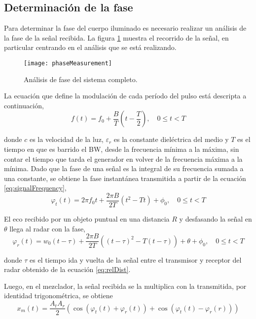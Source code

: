 \subsection{Determinación de la fase}

Para determinar la fase del cuerpo iluminado es necesario realizar un análisis de la fase de la señal recibida. La figura \ref{fig:phaseSystem} muestra el recorrido de la señal, en particular centrando en el análisis que se está realizando.
\begin{figure}[htb]
 \centering
 \texttt{[image: phaseMeasurement]}
 \caption{Análisis de fase del sistema completo.}
 \label{fig:phaseSystem}
\end{figure}

La ecuación que define la modulación de cada período del pulso está descripta a continuación,
\begin{equation}
  f(t) = f_0 + \dfrac{B}{T}(t-\dfrac{T}{2}),\quad 0 \le t < T
  \label{eq:signalFrequency}
\end{equation}

donde $c$ es la velocidad de la luz, $\varepsilon_r$ es la constante dieléctrica del medio \cite{Brennan2014a} y $T$ es el tiempo en que es barrido el BW, desde la frecuencia mínima a la máxima, sin contar el tiempo que tarda el generador en volver de la frecuencia máxima a la mínima. Dado que la fase de una señal es la integral de su frecuencia sumada a una constante, se obtiene la fase instantánea transmitida a partir de la ecuación \ref{eq:signalFrequency},
\begin{equation}
  \varphi_t(t) = 2\pi f_0t + \dfrac{2\pi B}{2T}(t^2-Tt) + \phi_0,\quad 0 \le t < T
  \label{eq:signalFrequency2}
\end{equation}

El eco recibido por un objeto puntual en una distancia $R$ y desfasando la señal en $\theta$ llega al radar con la fase,
\begin{equation}
  \varphi_r(t) = w_0(t-\tau) + \dfrac{2\pi B}{2T}((t - \tau)^2-T(t - \tau)) + \theta + \phi_0,\quad 0 \le t < T
  \label{eq:signalFrequency3}
\end{equation}

donde $\tau$ es el tiempo ida y vuelta de la señal entre el transmisor y receptor del radar obtenido de la ecuación \ref{eq:relDist}.

Luego, en el mezclador, la señal recibida se la multiplica con la transmitida, por identidad trigonométrica, se obtiene
\begin{equation}
  x_m(t) = \dfrac{A_tA_r}{2}(\cos(\varphi_t(t)+\varphi_r(t)) + \cos(\varphi_t(t)- \varphi_r(r)))
  \label{eq:signalFrequency4}
\end{equation}

